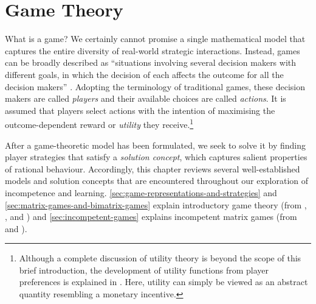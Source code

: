 
\chapter{Game Theory} \label{chp:game-theory}
    What is a game?
    We certainly cannot promise a single mathematical model that captures the entire diversity of real-world strategic interactions.
    Instead, games can be broadly described as ``situations involving several decision makers with different goals, in which the decision of each affects the outcome for all the decision makers'' \parencite{Maschler2013}.
    Adopting the terminology of traditional games, these decision makers are called \emph{players} and their available choices are called \emph{actions}.
    It is assumed that players select actions with the intention of maximising the outcome-dependent reward or \emph{utility} they receive.\footnote{Although
        a complete discussion of utility theory is beyond the scope of this brief introduction, the development of utility functions from player preferences is explained in \parencite[Chapter 2]{Maschler2013}.
        Here, utility can simply be viewed as an abstract quantity resembling a monetary incentive.
    }

    After a game-theoretic model has been formulated, we seek to solve it by finding player strategies that satisfy a \emph{solution concept}, which captures salient properties of rational behaviour.
    Accordingly, this chapter reviews several well-established models and solution concepts that are encountered throughout our exploration of incompetence and learning.
    \autoref{sec:game-representations-and-strategies} and \autoref{sec:matrix-games-and-bimatrix-games} explain introductory game theory (from \parencite{Maschler2013}, \parencite{Osborne1994}, and \parencite{Owen2013}) and \autoref{sec:incompetent-games} explains incompetent matrix games (from \parencite{Beck2013} and \parencite{Beck2007}).



